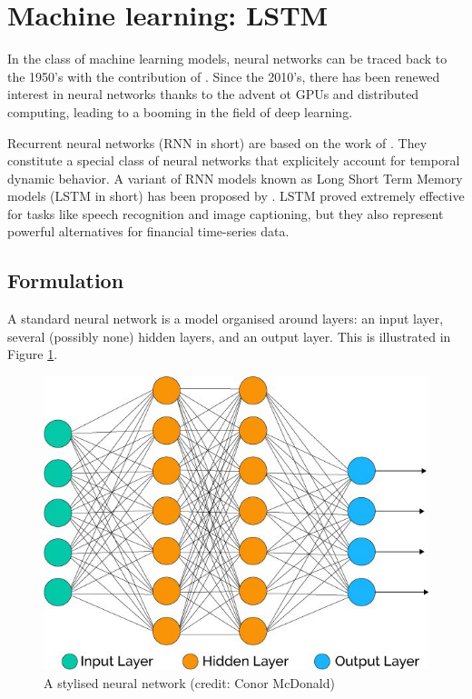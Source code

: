 \section{Machine learning: LSTM}
\label{chapter3_section7}

In the class of machine learning models, neural networks can be traced back to the 1950's with the contribution of \cite{Rosenblatt1958}. Since the 2010's, there has been renewed interest in neural networks thanks to the advent ot GPUs and distributed computing, leading to a booming in the field of deep learning.

Recurrent neural networks (RNN in short) are based on the work of \cite{Hopfield1982}. They constitute a special class of neural networks that explicitely account for temporal dynamic behavior. A variant of RNN models known as Long Short Term Memory models (LSTM in short) has been proposed by \cite{Hochreiter1997}. LSTM proved extremely effective for tasks like speech recognition and image captioning, but they also represent powerful alternatives for financial time-series data.


\subsection{Formulation}
\label{chapter3_section7_subsection1}

A standard neural network is a model organised around layers: an input layer, several (possibly none) hidden layers, and an output layer. This is illustrated in Figure \ref{fig_c3_s7_ss1_1}. \vspace{3mm}

\begin{figure}[H]
\centering
\includegraphics[scale=0.5]{images/neural_network.jpeg}
\caption{A stylised neural network (credit: Conor McDonald)}
\label{fig_c3_s7_ss1_1} 
\end{figure}

